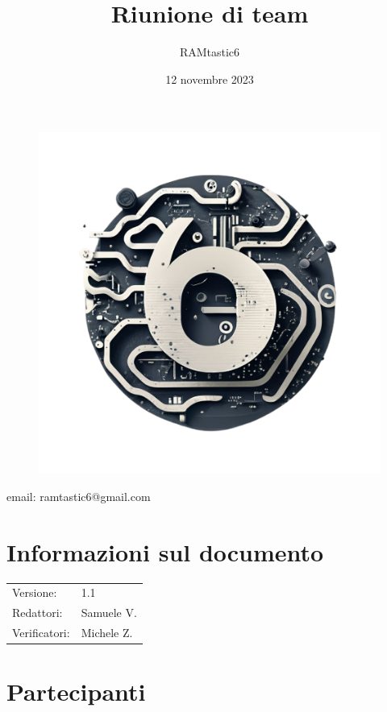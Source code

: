 \documentclass[12pt, oneside]{article}
\author{RAMtastic6}
\begin{document}
\thispagestyle{empty}
\title{Riunione di team}
\date{12 novembre 2023} %

\maketitle
\begin{figure}[h]
	\centering
	\includegraphics[scale=0.3]{logo.png}
	\label{}
\end{figure}
\begin{center}
    email: ramtastic6@gmail.com
\end{center}

\section*{Informazioni sul documento}
\begin{tabular}{ll}
Versione: & 1.1 \\
Redattori: & Samuele V. \\
Verificatori: & Michele Z.
\end{tabular}
\newpage

\tableofcontents
\newpage

\section{Partecipanti}
\end{document}
